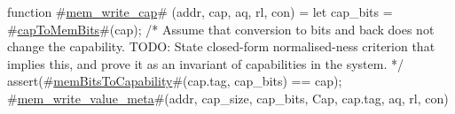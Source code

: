 function #\hyperref[sailRISCVzmemzywritezycap]{mem\_write\_cap}# (addr, cap, aq, rl, con) = {
  let cap_bits = #\hyperref[sailRISCVzcapToMemBits]{capToMemBits}#(cap);
  /* Assume that conversion to bits and back does not change the capability.
     TODO: State closed-form normalised-ness criterion that implies this,
     and prove it as an invariant of capabilities in the system. */
  assert(#\hyperref[sailRISCVzmemBitsToCapability]{memBitsToCapability}#(cap.tag, cap_bits) == cap);
  #\hyperref[sailRISCVzmemzywritezyvaluezymeta]{mem\_write\_value\_meta}#(addr, cap_size, cap_bits, Cap, cap.tag, aq, rl, con)
}
